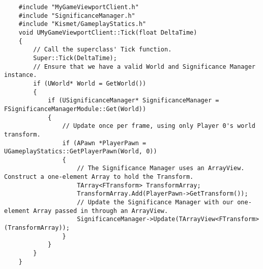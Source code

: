     \begin{lstlisting}
    #include "MyGameViewportClient.h"
    #include "SignificanceManager.h"
    #include "Kismet/GameplayStatics.h"
    void UMyGameViewportClient::Tick(float DeltaTime)
    {
        // Call the superclass' Tick function.
        Super::Tick(DeltaTime);
        // Ensure that we have a valid World and Significance Manager instance.
        if (UWorld* World = GetWorld())
        {
            if (USignificanceManager* SignificanceManager = FSignificanceManagerModule::Get(World))
            {
                // Update once per frame, using only Player 0's world transform.
                if (APawn *PlayerPawn = UGameplayStatics::GetPlayerPawn(World, 0))
                {
                    // The Significance Manager uses an ArrayView. Construct a one-element Array to hold the Transform.
                    TArray<FTransform> TransformArray;
                    TransformArray.Add(PlayerPawn->GetTransform());
                    // Update the Significance Manager with our one-element Array passed in through an ArrayView.
                    SignificanceManager->Update(TArrayView<FTransform>(TransformArray));
                }
            }
        }
    }
    \end{lstlisting}
